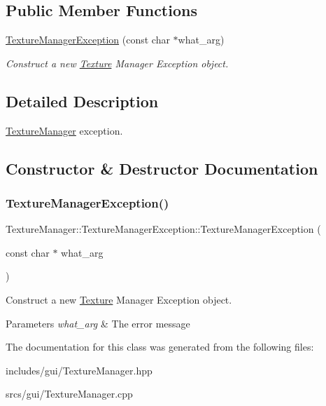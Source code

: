 \subsection*{Public Member Functions}
\begin{DoxyCompactItemize}
\item 
\hyperlink{class_texture_manager_1_1_texture_manager_exception_a9a254bfd3e35863806ab7bdc690b455b}{Texture\+Manager\+Exception} (const char $\ast$what\+\_\+arg)
\begin{DoxyCompactList}\small\item\em Construct a new \hyperlink{struct_texture}{Texture} Manager Exception object. \end{DoxyCompactList}\end{DoxyCompactItemize}


\subsection{Detailed Description}
\hyperlink{class_texture_manager}{Texture\+Manager} exception. 

\subsection{Constructor \& Destructor Documentation}
\mbox{\label{class_texture_manager_1_1_texture_manager_exception_a9a254bfd3e35863806ab7bdc690b455b}} 
\subsubsection{\texorpdfstring{Texture\+Manager\+Exception()}{TextureManagerException()}}
{\footnotesize\ttfamily Texture\+Manager\+::\+Texture\+Manager\+Exception\+::\+Texture\+Manager\+Exception (\begin{DoxyParamCaption}\item[{const char $\ast$}]{what\+\_\+arg }\end{DoxyParamCaption})\hspace{0.3cm}{\ttfamily [explicit]}}



Construct a new \hyperlink{struct_texture}{Texture} Manager Exception object. 


\begin{DoxyParams}{Parameters}
{\em what\+\_\+arg} & The error message \\
\hline
\end{DoxyParams}


The documentation for this class was generated from the following files\+:\begin{DoxyCompactItemize}
\item 
includes/gui/Texture\+Manager.\+hpp\item 
srcs/gui/Texture\+Manager.\+cpp\end{DoxyCompactItemize}
